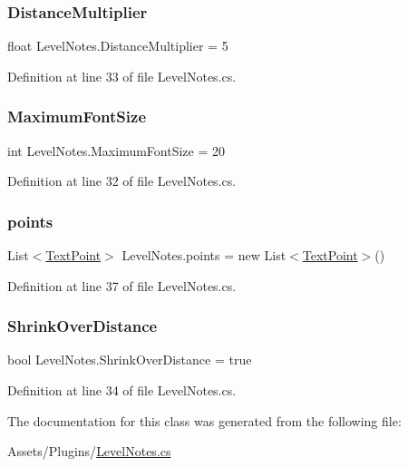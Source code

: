 \subsubsection{\texorpdfstring{Distance\+Multiplier}{DistanceMultiplier}}
{\footnotesize\ttfamily float Level\+Notes.\+Distance\+Multiplier = 5}



Definition at line 33 of file Level\+Notes.\+cs.

\mbox{\label{class_level_notes_ab121206e2192ea8272982747f04ff836}} 
\subsubsection{\texorpdfstring{Maximum\+Font\+Size}{MaximumFontSize}}
{\footnotesize\ttfamily int Level\+Notes.\+Maximum\+Font\+Size = 20}



Definition at line 32 of file Level\+Notes.\+cs.

\mbox{\label{class_level_notes_ae4cc65d86f40bc434a44e80764ab8390}} 
\subsubsection{\texorpdfstring{points}{points}}
{\footnotesize\ttfamily List$<$\mbox{\hyperlink{class_level_notes_1_1_text_point}{Text\+Point}}$>$ Level\+Notes.\+points = new List$<$\mbox{\hyperlink{class_level_notes_1_1_text_point}{Text\+Point}}$>$()}



Definition at line 37 of file Level\+Notes.\+cs.

\mbox{\label{class_level_notes_a525161818a63bbbb31a275da52d779f0}} 
\subsubsection{\texorpdfstring{Shrink\+Over\+Distance}{ShrinkOverDistance}}
{\footnotesize\ttfamily bool Level\+Notes.\+Shrink\+Over\+Distance = true}



Definition at line 34 of file Level\+Notes.\+cs.



The documentation for this class was generated from the following file\+:\begin{DoxyCompactItemize}
\item 
Assets/\+Plugins/\mbox{\hyperlink{_level_notes_8cs}{Level\+Notes.\+cs}}\end{DoxyCompactItemize}
